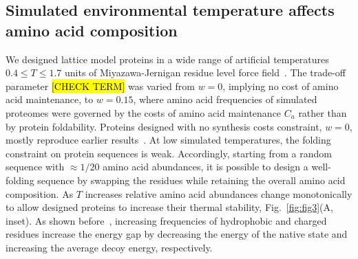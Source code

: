 \documentclass[10pt,letterpaper]{article}
\begin{document}
\subsection*{Simulated environmental temperature affects amino acid composition}

We designed lattice model proteins in a wide range of artificial temperatures $0.4\leq T\leq 1.7$ units of Miyazawa-Jernigan residue level force field~\cite{Miyazawa1999SelfConsistent}. The trade-off parameter \hl{[CHECK TERM]} was varied from  $\mathit{w}=0$, implying no cost of amino acid maintenance, to $\mathit{w}=0.15$, where amino acid frequencies of simulated proteomes were governed by the costs of amino acid maintenance $C_{a}$ rather than by protein foldability. Proteins designed with no synthesis costs constraint, $\mathit{w}=0$, mostly reproduce earlier results~\cite{Berezovsky2007Positive}.
At low simulated temperatures, the folding constraint on protein sequences is weak. Accordingly, starting from a random sequence with $\approx 1/20$ amino acid abundances, it is possible to design a well-folding sequence by swapping the residues while retaining the overall amino acid composition.  As $T$ increases relative amino acid abundances change monotonically to allow designed proteins to increase their thermal stability, Fig.~\ref{fig:fig3}(A, inset). As shown before~\cite{Berezovsky2007Positive}, increasing frequencies of hydrophobic and charged residues increase the energy gap by decreasing the energy of the native state and increasing the average decoy energy, respectively. 






\end{document}
